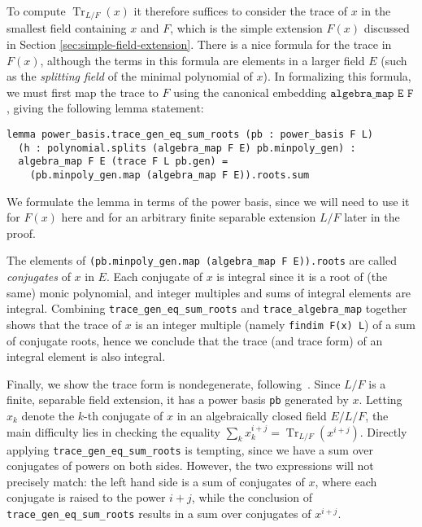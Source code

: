 \documentclass[a4paper,USenglish,cleveref, autoref, thm-restate]{lipics-v2021}
\newcommand{\lean}[1]{\texttt{#1}\xspace} %
\DeclareMathOperator{\Tr}{Tr}
\begin{document}
To compute $\Tr_{L/F}(x)$ it therefore suffices to consider the trace of $x$ in the smallest field containing $x$ and $F$, which is the simple extension $F(x)$ discussed in Section \ref{sec:simple-field-extension}.
There is a nice formula for the trace in $F(x)$, although the terms in this formula are elements in a larger field $E$
(such as the \emph{splitting field} of the minimal polynomial of $x$).
In formalizing this formula, we must first map the trace to $F$ using the canonical embedding $\lean{algebra\_map E F}$,
giving the following lemma statement:
\begin{lstlisting}
lemma power_basis.trace_gen_eq_sum_roots (pb : power_basis F L)
  (h : polynomial.splits (algebra_map F E) pb.minpoly_gen) :
  algebra_map F E (trace F L pb.gen) =
    (pb.minpoly_gen.map (algebra_map F E)).roots.sum
\end{lstlisting}
We formulate the lemma in terms of the power basis, since we will need to use it for $F(x)$ here
and for an arbitrary finite separable extension $L / F$ later in the proof.

The elements of \lean{(pb.minpoly\_gen.map (algebra\_map F E)).roots} are called \emph{conjugates} of $x$ in $E$.
Each conjugate of $x$ is integral since it is a root of (the same) monic polynomial,
and integer multiples and sums of integral elements are integral.
Combining \lean{trace\_gen\_eq\_sum\_roots} and \lean{trace\_algebra\_map} together shows that the trace of $x$ is an integer multiple (namely \lean{findim F(x) L}) of a sum of conjugate roots, hence we conclude that the trace (and trace form) of an integral element is also integral.

Finally, we show the trace form is nondegenerate, following~\cite[Proposition~2.8]{Neukirch}.
Since $L / F$ is a finite, separable field extension, it has a power basis \lean{pb} generated by $x$.
Letting $x_k$ denote the $k$-th conjugate of $x$ in an algebraically closed field $E / L / F$,
the main difficulty lies in checking the equality $\sum_k x_k^{i + j} = \Tr_{L / F} (x^{i + j})$.
Directly applying \lean{trace\_gen\_eq\_sum\_roots} is tempting, since we have a sum over conjugates of powers on both sides.
However, the two expressions will not precisely match: the left hand side is a sum of conjugates of $x$, where each conjugate is raised to the power $i + j$,
while the conclusion of \lean{trace\_gen\_eq\_sum\_roots} results in a sum over conjugates of $x^{i + j}$.
\end{document}

